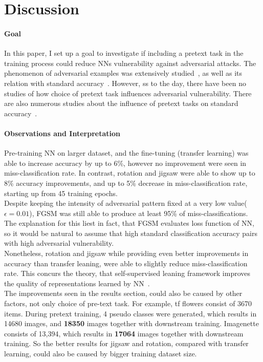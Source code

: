 \section{Discussion}

\paragraph{Goal}In this paper, I set up a goal to investigate if including a pretext task in the training process could reduce NNs
vulnerability against adversarial attacks.
The phenomenon of adversarial examples was extensively studied~\cite{ilyas2019adversarial, DBLP:journals/corr/abs-1802-08195, goodfellow2015explaining},
as well as its relation with standard accuracy~\cite{https://doi.org/10.48550/arxiv.1805.12152}.
However, ss to the day, there have been no studies of how choice of pretext task influences adversarial vulnerability.
There are also numerous studies about the influence of pretext tasks on standard
accuracy~\cite{DBLP:journals/corr/abs-1912-01991, DBLP:journals/corr/NorooziF16, kolesnikov2019revisiting}.


\paragraph{Observations and Interpretation}
Pre-training NN on larger dataset, and the fine-tuning (transfer learning) was able to increase accuracy by up to 6\%,
however no improvement were seen in miss-classification rate.
In contrast, rotation and jigsaw were able to show up to 8\% accuracy improvements,
and up to 5\% decrease in miss-classification  rate, starting up from 45 training epochs.
\\
Despite keeping the intensity of adversarial pattern fixed at a very low value($\epsilon = 0.01$),
FGSM was still able to produce at least 95\% of miss-classifications.
The explanation for this liest in fact, that FGSM evaluates loss function of NN,
so it would be natural to assume that high standard classification accuracy pairs with high adversarial vulnerability.
\\
Nonetheless, rotation and jigsaw while providing even better improvements in accuracy than transfer leaning,
were able to slightly reduce miss-classification rate.
This concurs the theory, that self-supervised leaning framework improves the quality of representations learned by NN~\cite{kolesnikov2019revisiting}.
\\
The improvements seen in the results section, could also be caused by other factors, not only choice of pre-text task.
For example, tf flowers consist of 3670 items.
During pretext training, 4 pseudo classes were generated,
which results in 14680 images, and \textbf{18350} images together with downstream training.
Imagenette consists of 13,394, which results in \textbf{17064} images together with downstream training.
So the better results for jigsaw and rotation, compared with transfer learning,
could also be caused by bigger training dataset size.

